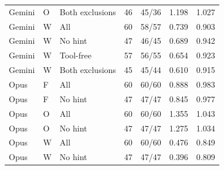 \begin{longtable}{lllrrrr}
Gemini & O & Both exclusions & 46 & 45/36 & 1.198 & 1.027 \\
Gemini & W & All & 60 & 58/57 & 0.739 & 0.903 \\
Gemini & W & No hint & 47 & 46/45 & 0.689 & 0.942 \\
Gemini & W & Tool-free & 57 & 56/55 & 0.654 & 0.923 \\
Gemini & W & Both exclusions & 45 & 45/44 & 0.610 & 0.915 \\
Opus & F & All & 60 & 60/60 & 0.888 & 0.983 \\
Opus & F & No hint & 47 & 47/47 & 0.845 & 0.977 \\
Opus & O & All & 60 & 60/60 & 1.355 & 1.043 \\
Opus & O & No hint & 47 & 47/47 & 1.275 & 1.034 \\
Opus & W & All & 60 & 60/60 & 0.476 & 0.849 \\
Opus & W & No hint & 47 & 47/47 & 0.396 & 0.809 \\
\bottomrule
\end{longtable}
